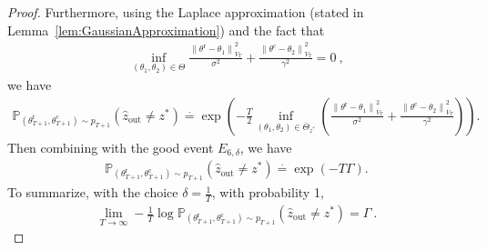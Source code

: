 \documentclass[accepted]{uai2025} %
\theoremstyle{plain}
\theoremstyle{definition}
\theoremstyle{remark}
\newcommand{\thetac}{\theta^{\mathrm{c}}}
\newcommand{\thetar}{\theta^{\mathrm{r}}}
\newcommand{\truethetac}{\theta^{\mathrm{c}}}
\newcommand{\truethetar}{\theta^{\mathrm{r}}}
\begin{document}
\begin{proof}
Furthermore, using the Laplace approximation (stated in Lemma~\ref{lem:GaussianApproximation}) and the fact that 
\begin{align*}
    \inf_{(\theta_1,\theta_2)\in {\Theta}}  
\frac{\left\| \truethetar - \theta_1 \right\|^2_{{V}_T}}{\sigma^2} 
+ \frac{\left\| \truethetac - \theta_2 \right\|^2_{{V}_T}}{\gamma^2} =0~,
\end{align*}
we have
\begin{align*}   \mathbb{P}_{(\thetar_{T+1},\thetac_{T+1})\sim p_{T+1}} (\hat{z}_\text{{out}} \neq z^*) \stackrel{\cdot}{=}\exp \left( -\frac{T}{2} \inf_{(\theta_1,\theta_2)\in \overline{\Theta}_{z^*}}\left( 
\frac{\left\| \truethetar - \theta_1 \right\|^2_{\overline{V}_T}}{\sigma^2} 
+ \frac{\left\| \truethetac - \theta_2 \right\|^2_{\overline{V}_T}}{\gamma^2} 
\right) \right).
\end{align*}
Then combining with the good event $E_{6,\delta}$, we have
\begin{align*}  \mathbb{P}_{(\thetar_{T+1},\thetac_{T+1})\sim p_{T+1}} (\hat{z}_\text{{out}} \neq z^*)\stackrel{\cdot}{=}
\exp \left( -T \Gamma \right).
\end{align*}
To summarize, with the choice $\delta=\frac{1}{T}$, with probability 1, 
\begin{align*}
        \lim_{T \to \infty} -\frac{1}{T} \log \mathbb{P}_{(\thetar_{T+1},\thetac_{T+1})\sim p_{T+1}} (\hat{z}_\text{{out}} \neq z^*) = \Gamma~.
    \end{align*}

\end{proof}
\end{document}
